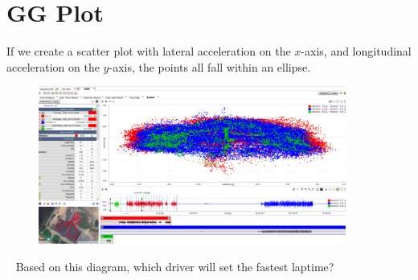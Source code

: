 \section*{GG Plot}

\begin{frame}
    If we create a scatter plot
    with lateral acceleration on the $x$-axis,
    and longitudinal acceleration on the $y$-axis,
    the points all fall within an ellipse.
    \begin{figure}
        \includegraphics[width=0.9\textwidth]{res/Testing GG Plot.png}
    \end{figure}
    \begin{block}{~}
        Based on this diagram,
        which driver will set the fastest laptime?
    \end{block}
\end{frame}

